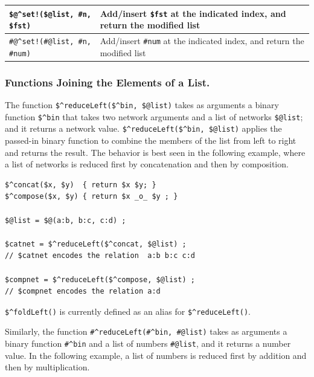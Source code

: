 \documentclass[letterpaper,12pt]{article}
\begin{document}
\vspace{.5cm}

\noindent
\begin{tabular}{|l|p{5.5cm}|}
\hline
\verb+$@^set!($@list, #n, $fst)+ & Add/insert \verb!$fst! at the indicated index, and return the
modified list\\
\hline
\verb+#@^set!(#@list, #n, #num)+ & Add/insert \verb!#num! at the indicated index, and return the
modified list\\
\hline
\end{tabular}

\vspace{.5cm}

\subsubsection{Functions Joining the Elements of a List.}

The function 
\verb!$^reduceLeft($^bin, $@list)! takes as arguments a binary function
\verb!$^bin! that takes two network arguments and a list of networks
\verb!$@list!; and it returns a network value.
\verb!$^reduceLeft($^bin, $@list)!  
applies the passed-in binary function to combine the members of
the list from left to right and returns the result.  The behavior is best
seen in the following example, where a list of networks is reduced first
by concatenation and then by composition.

\begin{samepage}
\begin{Verbatim}[fontsize=\small]
$^concat($x, $y)  { return $x $y; }
$^compose($x, $y) { return $x _o_ $y ; }

$@list = $@(a:b, b:c, c:d) ;

$catnet = $^reduceLeft($^concat, $@list) ;
// $catnet encodes the relation  a:b b:c c:d

$compnet = $^reduceLeft($^compose, $@list) ;
// $compnet encodes the relation a:d
\end{Verbatim}

\noindent
\verb!$^foldLeft()! is currently defined as an alias for \verb!$^reduceLeft()!.
\end{samepage}

Similarly, the function 
\verb!#^reduceLeft(#^bin, #@list)! 
takes as arguments 
a binary function \verb!#^bin! and
a list of numbers \verb!#@list!,
and it returns a number value.  In
the following example, a list of numbers is reduced first by addition and then by
multiplication.
\end{document}
